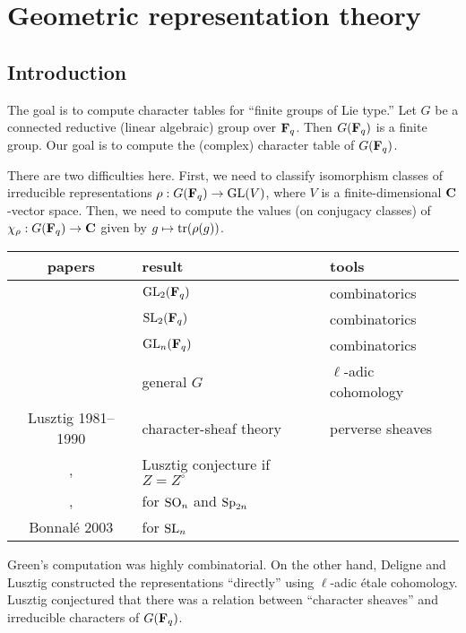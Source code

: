 
\section{Geometric representation theory}





\subsection{Introduction}

The goal is to compute character tables for ``finite groups of Lie type.'' Let 
$G$ be a connected reductive (linear algebraic) group over $\mathbf{F}_q$. Then 
$G(\mathbf{F}_q)$ is a finite group. Our goal is to compute the (complex) character 
table of $G(\mathbf{F}_q)$. 

There are two difficulties here. First, we need to classify isomorphism classes 
of irreducible representations $\rho:G(\mathbf{F}_q) \to \operatorname{GL}(V)$, where $V$ 
is a finite-dimensional $\mathbf{C}$-vector space. Then, we need to compute the values 
(on conjugacy classes) of $\chi_\rho:G(\mathbf{F}_q) \to \mathbf{C}$ given by 
$g\mapsto \operatorname{tr}(\rho(g))$. 
\begin{center}
\begin{tabular}{c|ll}
papers & result  & tools \\ \hline
\cite{j07} & $\operatorname{GL}_2(\mathbf{F}_q)$ & combinatorics \\
\cite{s07} & $\operatorname{SL}_2(\mathbf{F}_q)$ & combinatorics \\
\cite{g55} & $\operatorname{GL}_n(\mathbf{F}_q)$  & combinatorics \\
\cite{dl76} & general $G$ & $\ell$-adic cohomology \\
Lusztig 1981--1990 & character-sheaf theory & perverse sheaves \\
\cite{s95a}, \cite{s95b} & Lusztig conjecture if $Z=Z^\circ$  \\
\cite{w04a}, \cite{w04b} & for $\operatorname{SO}_n$ and $\operatorname{Sp}_{2 n}$ \\
Bonnal\'e 2003 & for $\operatorname{SL}_n$
\end{tabular}
\end{center}
Green's computation was highly combinatorial. On the other hand, Deligne and 
Lusztig constructed the representations ``directly'' using $\ell$-adic 
\'etale cohomology. Lusztig conjectured that there was a relation between 
``character sheaves'' and irreducible characters of $G(\mathbf{F}_q)$. 

